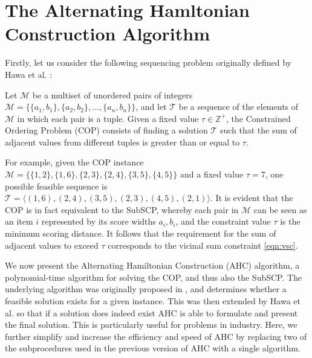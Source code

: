 \documentclass{elsarticle}
\begin{document}
\section{The Alternating Hamltonian Construction Algorithm}
\label{sec:ahc}
\noindent Firstly, let us consider the following sequencing problem originally defined by Hawa et al. \cite{hawa2018}:

\begin{definition} %
	\label{defn:cop}
	Let $\mathcal{M}$ be a multiset of unordered pairs of integers $\mathcal{M} = \{\{a_1, b_1\}, \{a_2, b_2\},\dotsc,\{a_n, b_n\}\}$, and let $\mathcal{T}$ be a sequence of the elements of $\mathcal{M}$ in which each pair is a tuple. Given a fixed value $\tau \in \mathbb{Z}^+$, the Constrained Ordering Problem (COP) consists of finding a solution $\mathcal{T}$ such that the sum of adjacent values from different tuples is greater than or equal to $\tau$.
\end{definition}

\noindent For example, given the COP instance $\mathcal{M} = \{\{1,2\}, \{1,6\}, \{2,3\}, \{2,4\}, \{3,5\}, \{4,5\}\}$ and a fixed value $\tau = 7$, one possible feasible sequence is $\mathcal{T} = \langle(1,6), (2,4), (3,5), (2,3), (4,5), (2,1)\rangle$. It is evident that the COP is in fact equivalent to the SubSCP, whereby each pair in $\mathcal{M}$ can be seen as an item $i$ represented by its score widths $a_i, b_i$, and the constraint value $\tau$ is the minimum scoring distance. It follows that the requirement for the sum of adjacent values to exceed $\tau$ corresponds to the vicinal sum constraint \eqref{eqn:vsc}.

We now present the Alternating Hamiltonian Construction (AHC) algorithm, a polynomial-time algorithm for solving the COP, and thus also the SubSCP. The underlying algorithm was originally proposed in \cite{becker2010}, and determines whether a feasible solution exists for a given instance. This was then extended by Hawa et al. \cite{hawa2018} so that if a solution does indeed exist AHC is able to formulate and present the final solution. This is particularly useful for problems in industry. Here, we further simplify and increase the efficiency and speed of AHC by replacing two of the subprocedures used in the previous version of AHC with a single algorithm.
\end{document}
